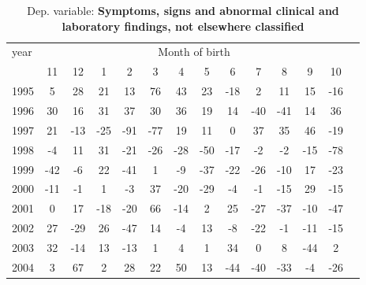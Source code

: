  \begin{table}[H] \begin{threeparttable} \centering \caption{Dep. variable: \textbf{Symptoms, signs and abnormal clinical and laboratory findings, not elsewhere classified}} {\def\sym#1{\ifmmode^{#1}\else\(^{#1}\)\fi} \begin{tabular}{l*{13}{c}} \toprule year & \multicolumn{12}{c}{Month of birth} \\ \cmidrule(lr){2-13} 
            &          11&          12&           1&           2&           3&           4&           5&           6&           7&           8&           9&          10\\
1995        &           5&          28&          21&          13&          76&          43&          23&         -18&           2&          11&          15&         -16\\
1996        &          30&          16&          31&          37&          30&          36&          19&          14&         -40&         -41&          14&          36\\
1997        &          21&         -13&         -25&         -91&         -77&          19&          11&           0&          37&          35&          46&         -19\\
1998        &          -4&          11&          31&         -21&         -26&         -28&         -50&         -17&          -2&          -2&         -15&         -78\\
1999        &         -42&          -6&          22&         -41&           1&          -9&         -37&         -22&         -26&         -10&          17&         -23\\
2000        &         -11&          -1&           1&          -3&          37&         -20&         -29&          -4&          -1&         -15&          29&         -15\\
2001        &           0&          17&         -18&         -20&          66&         -14&           2&          25&         -27&         -37&         -10&         -47\\
2002        &          27&         -29&          26&         -47&          14&          -4&          13&          -8&         -22&          -1&         -11&         -15\\
2003        &          32&         -14&          13&         -13&           1&           4&           1&          34&           0&           8&         -44&           2\\
2004        &           3&          67&           2&          28&          22&          50&          13&         -44&         -40&         -33&          -4&         -26\\

\end{tabular}}
\end{threeparttable}
\end{table}
